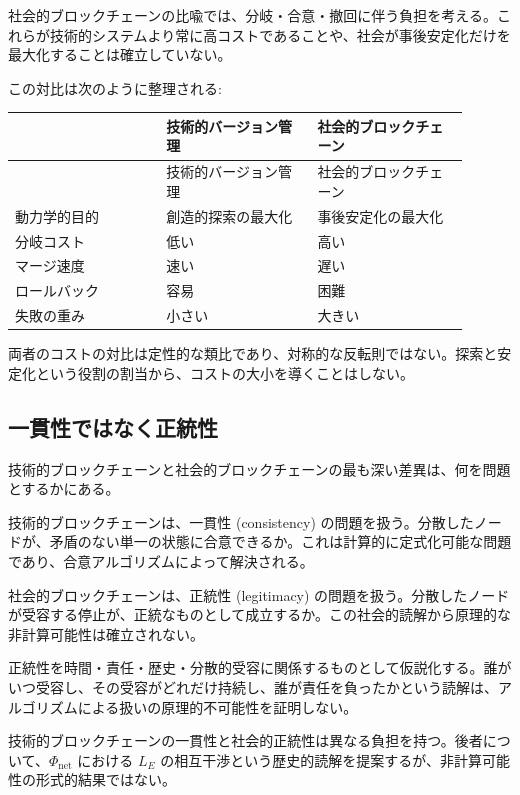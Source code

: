 社会的ブロックチェーンの比喩では、分岐・合意・撤回に伴う負担を考える。これらが技術的システムより常に高コストであることや、社会が事後安定化だけを最大化することは確立していない。

この対比は次のように整理される:

\begin{longtable}{@{}p{0.30\linewidth}p{0.30\linewidth}p{0.30\linewidth}@{}}
\toprule
 & 技術的バージョン管理 & 社会的ブロックチェーン \\
\midrule
\endfirsthead
\toprule
 & 技術的バージョン管理 & 社会的ブロックチェーン \\
\midrule
\endhead
動力学的目的 & 創造的探索の最大化 & 事後安定化の最大化 \\
分岐コスト & 低い & 高い \\
マージ速度 & 速い & 遅い \\
ロールバック & 容易 & 困難 \\
失敗の重み & 小さい & 大きい \\
\bottomrule
\end{longtable}


両者のコストの対比は定性的な類比であり、対称的な反転則ではない。探索と安定化という役割の割当から、コストの大小を導くことはしない。

\bigskip


\subsection{一貫性ではなく正統性}


技術的ブロックチェーンと社会的ブロックチェーンの最も深い差異は、何を問題とするかにある。

技術的ブロックチェーンは、一貫性 (consistency) の問題を扱う。分散したノードが、矛盾のない単一の状態に合意できるか。これは計算的に定式化可能な問題であり、合意アルゴリズムによって解決される。

社会的ブロックチェーンは、正統性 (legitimacy) の問題を扱う。分散したノードが受容する停止が、正統なものとして成立するか。この社会的読解から原理的な非計算可能性は確立されない。

正統性を時間・責任・歴史・分散的受容に関係するものとして仮説化する。誰がいつ受容し、その受容がどれだけ持続し、誰が責任を負ったかという読解は、アルゴリズムによる扱いの原理的不可能性を証明しない。

技術的ブロックチェーンの一貫性と社会的正統性は異なる負担を持つ。後者について、$\Phi_{\text{net}}$ における $L_E$ の相互干渉という歴史的読解を提案するが、非計算可能性の形式的結果ではない。

